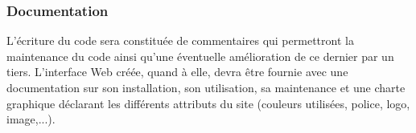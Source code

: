 
\subsubsection{Documentation}
L'écriture du code sera constituée de commentaires qui permettront la maintenance du code ainsi qu'une éventuelle amélioration de ce dernier par un tiers.
L'interface Web créée, quand à elle, devra être fournie avec une documentation sur son installation, son utilisation, sa maintenance et une charte graphique déclarant les différents attributs du site (couleurs utilisées, police, logo, image,...).

